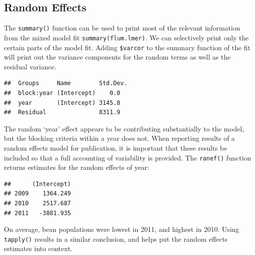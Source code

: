 \documentclass[letterpaper,]{book}
\newenvironment{Shaded}{\begin{snugshade}}{\end{snugshade}}
\newcommand{\FloatTok}[1]{\textcolor[rgb]{0.00,0.00,0.81}{#1}}
\newcommand{\KeywordTok}[1]{\textcolor[rgb]{0.13,0.29,0.53}{\textbf{#1}}}
\newcommand{\NormalTok}[1]{#1}
\newcommand{\OperatorTok}[1]{\textcolor[rgb]{0.81,0.36,0.00}{\textbf{#1}}}
\begin{document}
\hypertarget{random-effects}{%
\subsection{Random Effects}\label{random-effects}}

The \texttt{summary()} function can be used to print most of the relevant information from the mixed model fit \texttt{summary(flum.lmer)}. We can selectively print only the certain parts of the model fit. Adding \texttt{\$varcor} to the summary function of the fit will print out the variance components for the random terms as well as the residual variance.

\begin{Shaded}
\end{Shaded}

\begin{verbatim}
##  Groups     Name        Std.Dev.
##  block:year (Intercept)    0.0  
##  year       (Intercept) 3145.8  
##  Residual               8311.9
\end{verbatim}

The random `year' effect appears to be contributing substantially to the model, but the blocking criteria within a year does not. When reporting results of a random effects model for publication, it is important that these results be included so that a full accounting of variability is provided. The \texttt{ranef()} function returns estimates for the random effects of year:

\begin{Shaded}
\end{Shaded}

\begin{verbatim}
##      (Intercept)
## 2009    1364.249
## 2010    2517.687
## 2011   -3881.935
\end{verbatim}

On average, bean populations were lowest in 2011, and highest in 2010. Using \texttt{tapply()} results in a similar conclusion, and helps put the random effects estimates into context.

\begin{Shaded}
\end{Shaded}
\end{document}
